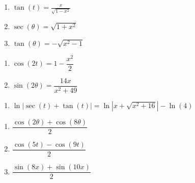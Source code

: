 \documentclass{ximera}
\begin{document}
\begin{multicols}{3}
\begin{enumerate}
\setcounter{enumi}{\value{HW}}

\addtocounter{enumi}{19}

\item  $\tan(t) = \frac{x}{\sqrt{1 - x^2}}$

\item  $\sec(\theta) = \sqrt{1+x^2}$ 

\item  $\tan(\theta) = -\sqrt{x^2-1}$ 

\setcounter{HW}{\value{enumi}}
\end{enumerate}

\end{multicols}

\begin{multicols}{2}
\begin{enumerate}

\setcounter{enumi}{\value{HW}}

\item $\cos(2t) = 1 - \dfrac{x^{2}}{2}$

\item $\sin(2\theta) = \dfrac{14x}{x^{2} + 49}$

\setcounter{HW}{\value{enumi}}

\end{enumerate}

\end{multicols}

\begin{enumerate}

\setcounter{enumi}{\value{HW}}
\item $\ln|\sec(t) + \tan(t)| = \ln |x + \sqrt{x^{2} + 16}| - \ln(4)$ 

\setcounter{HW}{\value{enumi}}

\end{enumerate}

\begin{multicols}{3}

\begin{enumerate}

\setcounter{enumi}{\value{HW}}

\addtocounter{enumi}{11}

\item $\dfrac{\cos(2\theta) + \cos(8\theta)}{2}$
\item $\dfrac{\cos(5t) - \cos(9t)}{2}$
\item $\dfrac{\sin(8x) + \sin(10x)}{2}$

\setcounter{HW}{\value{enumi}}

\end{enumerate}

\end{multicols}
\end{document}
